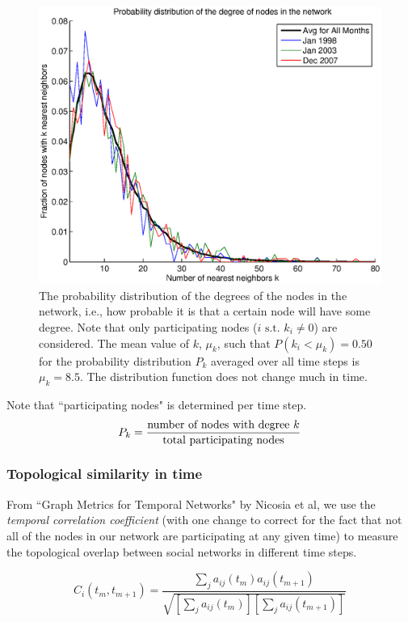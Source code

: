 \documentclass[12pt]{article}
\begin{document}
\begin{figure}[H]
\includegraphics[width = .9\textwidth]{Graficos/ProbDistk.eps}
\caption{The probability distribution of the degrees of the nodes in the network, i.e., how probable it is that a certain node will have some degree. Note that only participating nodes (\(i \text{ s.t. } k_i \neq 0\)) are considered. \newline The mean value of \(k\), \(\mu_k\), such that \(P(k_i < \mu_k) = 0.50\) for the probability distribution \(P_k\) averaged over all time steps is \(\mu_k = 8.5\).
The distribution function does not change much in time. }
\label{fig:ProbDistk}
\end{figure}

Note that ``participating nodes" is determined per time step.
\begin{equation}
P_k = \frac{\text{number of nodes with degree \( k \)}}{\text{total participating nodes}}
\end{equation}

\subsubsection{Topological similarity in time}

From ``Graph Metrics for Temporal Networks" by Nicosia et al, we use the \emph{temporal correlation coefficient} (with one change to correct for the fact that not all of the nodes in our network are participating at any given time) to measure the topological overlap between social networks in different time steps.

\begin{equation}
C_i(t_m,t_{m+1}) = \frac{ \sum_j a_{ij}(t_m)a_{ij}(t_{m+1})}{\sqrt{[ \sum_j a_{ij}(t_m)][ \sum_j a_{ij}(t_{m+1})]}}
\label{eq:Ci}
\end{equation}
\end{document}
